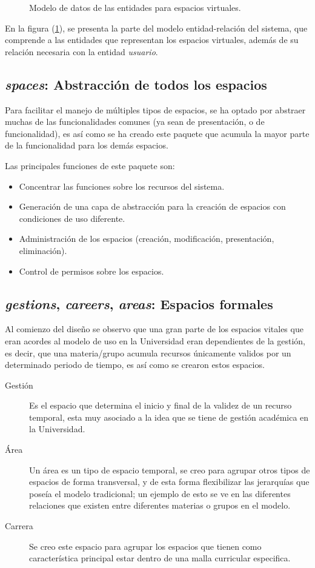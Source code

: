 \begin{figure}
\centering

\caption{Modelo de datos de las entidades para espacios virtuales.}
\label{modelo2}
\end{figure}

En la figura (\ref{modelo2}), se presenta la parte del modelo entidad-relación
del sistema, que comprende a las entidades que representan los espacios
virtuales, además de su relación necesaria con la entidad \emph{usuario}.

\subsection{\emph{spaces}: Abstracción de todos los espacios}
Para facilitar el manejo de múltiples tipos de espacios, se ha optado por
abstraer muchas de las funcionalidades comunes (ya sean de presentación, o de
funcionalidad), es así como se ha creado este paquete que acumula la mayor parte
de la funcionalidad para los demás espacios.

Las principales funciones de este paquete son:

\begin{itemize}
\item Concentrar las funciones sobre los recursos del sistema.
\item Generación de una capa de abstracción para la creación de espacios con
condiciones de uso diferente.
\item Administración de los espacios (creación, modificación, presentación,
eliminación).
\item Control de permisos sobre los espacios.
\end{itemize}

\subsection{\emph{gestions}, \emph{careers}, \emph{areas}: Espacios formales}
Al comienzo del diseño se observo que una gran parte de los espacios vitales que
eran acordes al modelo de uso en la Universidad eran dependientes de la gestión,
es decir, que una materia/grupo acumula recursos únicamente validos por un
determinado periodo de tiempo, es así como se crearon estos espacios.

\begin{description}
\item [Gestión] Es el espacio que determina el inicio y final de la validez de
un recurso temporal, esta muy asociado a la idea que se tiene de gestión
académica en la Universidad.
\item [Área] Un área es un tipo de espacio temporal, se creo para agrupar otros
tipos de espacios de forma transversal, y de esta forma flexibilizar las
jerarquías que poseía el modelo tradicional; un ejemplo de esto se ve en las
diferentes relaciones que existen entre diferentes materias o grupos en el
modelo.
\item [Carrera] Se creo este espacio para agrupar los espacios que tienen como
característica principal estar dentro de una malla curricular especifica.
\end{description}

